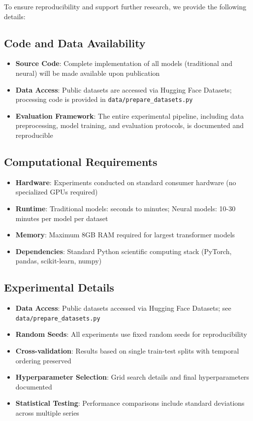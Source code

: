 \documentclass[11pt]{article}
\begin{document}
To ensure reproducibility and support further research, we provide the following details:

\subsection*{Code and Data Availability}

\begin{itemize}
\item \textbf{Source Code}: Complete implementation of all models (traditional and neural) will be made available upon publication
\item \textbf{Data Access}: Public datasets are accessed via Hugging Face Datasets; processing code is provided in \texttt{data/prepare\_datasets.py}
\item \textbf{Evaluation Framework}: The entire experimental pipeline, including data preprocessing, model training, and evaluation protocols, is documented and reproducible
\end{itemize}

\subsection*{Computational Requirements}

\begin{itemize}
\item \textbf{Hardware}: Experiments conducted on standard consumer hardware (no specialized GPUs required)
\item \textbf{Runtime}: Traditional models: seconds to minutes; Neural models: 10-30 minutes per model per dataset
\item \textbf{Memory}: Maximum 8GB RAM required for largest transformer models
\item \textbf{Dependencies}: Standard Python scientific computing stack (PyTorch, pandas, scikit-learn, numpy)
\end{itemize}

\subsection*{Experimental Details}

\begin{itemize}
\item \textbf{Data Access}: Public datasets accessed via Hugging Face Datasets; see \texttt{data/prepare\_datasets.py}
\item \textbf{Random Seeds}: All experiments use fixed random seeds for reproducibility
\item \textbf{Cross-validation}: Results based on single train-test splits with temporal ordering preserved
\item \textbf{Hyperparameter Selection}: Grid search details and final hyperparameters documented
\item \textbf{Statistical Testing}: Performance comparisons include standard deviations across multiple series
\end{itemize}
\end{document}
